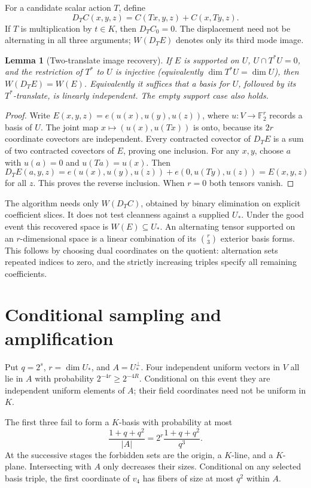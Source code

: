 \documentclass[11pt]{article}
\newtheorem{lemma}[theorem]{Lemma}
\newcommand{\F}{\mathbb F}
\begin{document}
For a candidate scalar action $T$, define
\begin{equation}\label{eq:defect}
 D_T C(x,y,z)=C(Tx,y,z)+C(x,Ty,z).
\end{equation}
If $T$ is multiplication by $t\in K$, then $D_T C_0=0$.
The displacement need not be alternating in all three arguments;
$W(D_T E)$ denotes only its third mode image.

\begin{lemma}[Two-translate image recovery]\label{lem:two}
If $E$ is supported on $U$, $U\cap T^*U=0$, and the restriction of $T^*$
to $U$ is injective (equivalently $\dim T^*U=\dim U$), then
$W(D_T E)=W(E)$. Equivalently it suffices that a basis for $U$, followed by
its $T^*$-translate, is linearly independent. The empty support case also holds.
\end{lemma}
\begin{proof}
Write $E(x,y,z)=e(u(x),u(y),u(z))$, where $u:V\to\F_2^r$ records a
basis of $U$. The joint map $x\mapsto(u(x),u(Tx))$ is onto, because its
$2r$ coordinate covectors are independent. Every contracted covector of
$D_T E$ is a sum of two contracted covectors of $E$, proving one inclusion.
For any $x,y$, choose $a$ with $u(a)=0$ and $u(Ta)=u(x)$. Then
\[
 D_T E(a,y,z)=e(u(x),u(y),u(z))+e(0,u(Ty),u(z))=E(x,y,z)
\]
for all $z$. This proves the reverse inclusion. When $r=0$ both tensors vanish.
\end{proof}

The algorithm needs only $W(D_T C)$, obtained by binary elimination on
explicit coefficient slices. It does not test cleanness against a supplied
$U_*$. Under the good event this recovered space is $W(E)\subseteq U_*$.
An alternating tensor supported on an $r$-dimensional space is a linear
combination of its $\binom r3$ exterior basis forms. This follows by choosing
dual coordinates on the quotient: alternation sets repeated indices to zero,
and the strictly increasing triples specify all remaining coefficients.

\section{Conditional sampling and amplification}
Put $q=2^s$, $r=\dim U_*$, and $A=U_*^\perp$. Four independent uniform
vectors in $V$ all lie in $A$ with probability $2^{-4r}\geq2^{-4R}$.
Conditional on this event they are independent uniform elements of $A$;
their field coordinates need not be uniform in $K$.

The first three fail to form a $K$-basis with probability at most
\[
 \frac{1+q+q^2}{|A|}=2^r\frac{1+q+q^2}{q^3}.
\]
At the successive stages the forbidden sets are the origin, a $K$-line,
and a $K$-plane. Intersecting with $A$ only decreases their sizes. Conditional
on any selected basis triple, the first coordinate of $v_4$ has fibers of
size at most $q^2$ within $A$.
\end{document}
